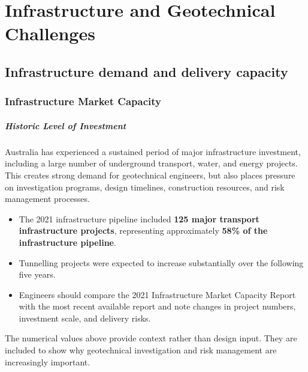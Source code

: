 \chapter{Infrastructure and Geotechnical Challenges}
\label{ch:context}

\section{Infrastructure demand and delivery capacity}
\label{sec:infrastructure-demand-and-delivery-capacity}

\subsection{Infrastructure Market Capacity}

\paragraph{Historic Level of Investment}
Australia has experienced a sustained period of major infrastructure investment, including a large number of underground transport, water, and energy projects. This creates strong demand for geotechnical engineers, but also places pressure on investigation programs, design timelines, construction resources, and risk management processes.

\begin{itemize}
 \item The 2021 infrastructure pipeline included \textbf{125 major transport infrastructure projects}, representing approximately \textbf{58\% of the infrastructure pipeline}.
 \item Tunnelling projects were expected to increase substantially over the following five years.
 \item Engineers should compare the 2021 Infrastructure Market Capacity Report with the most recent available report and note changes in project numbers, investment scale, and delivery risks.
\end{itemize}

\begin{notebox}
The numerical values above provide context rather than design input. They are included to show why geotechnical investigation and risk management are increasingly important.
\end{notebox}


